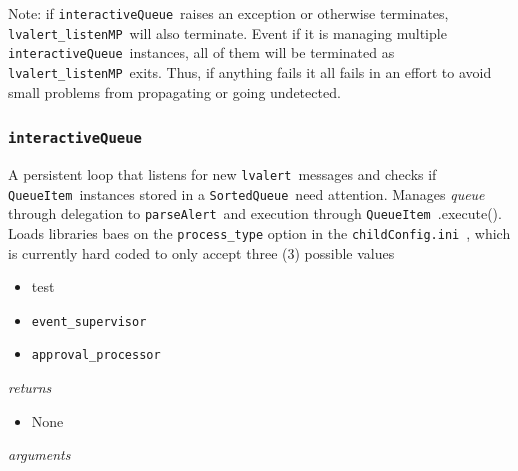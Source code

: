 \documentclass{article}
\newcommand{\alert}{\texttt{lvalert}~}
\newcommand{\lvalertListenMP}{\texttt{lvalert\_listenMP}~}
\newcommand{\interactiveQueue}{\texttt{interactiveQueue}~}
\newcommand{\parseAlert}{\texttt{parseAlert}~}
\newcommand{\SortedQueue}{\texttt{SortedQueue}~}
\newcommand{\QueueItem}{\texttt{QueueItem}~}
\newcommand{\childConfigini}{\texttt{childConfig.ini}~}
\newcommand{\approvalProcessor}{\texttt{approval\_processor}~}
\newcommand{\eventSupervisor}{\texttt{event\_supervisor}~}
\begin{document}
Note: if \interactiveQueue raises an exception or otherwise terminates, \lvalertListenMP will also terminate.
Event if it is managing multiple \interactiveQueue instances, all of them will be terminated as \lvalertListenMP exits.
Thus, if anything fails it all fails in an effort to avoid small problems from propagating or going undetected.


\subsubsection{\interactiveQueue}
\label{sec: interactiveQueue}

A persistent loop that listens for new \alert messages and checks if \QueueItem instances stored in a \SortedQueue need attention. 
Manages \textit{queue} through delegation to \parseAlert and execution through \QueueItem.execute(). 
Loads libraries baes on the \texttt{process\_type} option in the \childConfigini, which is currently hard coded to only accept three (3) possible values
\begin{itemize}
    \item{test}
    \item{\eventSupervisor}
    \item{\approvalProcessor}
\end{itemize}

\vspace{0.5cm}
\noindent
\textit{returns}

\begin{itemize}
    \item{None}
\end{itemize}

\noindent
\textit{arguments}
\end{document}
